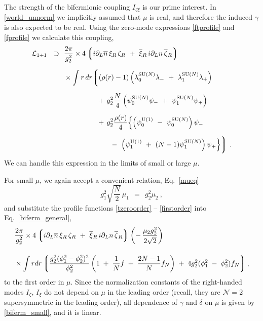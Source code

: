 \documentclass[12pt]{article}
\newcommand{\ntwo}{${\mathcal N}=2$ }
\newcommand{\p}{\partial}
\newcommand{\ov}{\overline}
\newcommand{\mc}[1]{\mathcal{#1}}
\newcommand{\lgr}{\left\lgroup}
\newcommand{\rgr}{\right\rgroup}
\newcommand{\loN}{\lambda_0^\text{SU($N$)}}
\newcommand{\llN}{\lambda_1^\text{SU($N$)}}
\newcommand{\poU}{\psi_0^{\rm U(1)}}
\newcommand{\plU}{\psi_1^{\rm U(1)}}
\newcommand{\poN}{\psi_0^\text{SU($N$)}}
\newcommand{\plN}{\psi_1^\text{SU($N$)}}
\begin{document}
	The strength of the bifermionic coupling $ I_{\zeta\xi} $ is  our prime  interest.
	In \eqref{world_unnorm} we  implicitly assumed that $ \mu $ is real, and therefore
	the induced $ \gamma $ is also expected to be real.
	Using the zero-mode expressions \eqref{ftprofile} and \eqref{fprofile} we calculate this coupling,
\begin{align}
%
\notag
	\mc{L}_{\rm 1+1} ~~\supset~~
	&
	\frac{2\pi}{g_2^2} \times  
	4 \lgr  i\p_L \ov{n}\, \xi_R \, \zeta_R  ~+~  \ov{\xi}{}_R \, i \p_L n\, \ov{\zeta}{}_R \rgr
	\\[2mm]
%
\notag
	&
	\times
	\int r\, dr 
	\biggl\lgroup  ( \rho(r)-1 ) \left( \loN \lambda_-   ~+~   \llN \lambda_+ \right)  \\[2mm]
%
\label{biferm_general}
	&
	\qquad\qquad~~
	+\,g_2^2 \frac{N}{4} \left( \poN \psi_-   ~+~   \plN \psi_+ \right)   
	\\[2mm]
%
\notag
	&
	\qquad\qquad~~
	+\, g_2^2 \frac{\rho(r)}{4} \Bigl\{ \left(\poU ~-~ \poN\right) \psi_-   \\[2mm]
\notag
	&
	\qquad\qquad\qquad\;\;
	     		         	-~ \left(\plU ~+~ (N-1)\plN\right) \psi_+ \Bigr\} 
	\biggr\rgroup~.
\end{align}
	We can handle this expression in the limits of small or large $ \mu $.

	For small $ \mu $, we again accept a convenient relation, Eq.~\eqref{mueq}
\[
	g_1^2 \sqrt{\frac{N}{2}}\, \mu_1 ~~=~~ g_2^2 \mu_2~,
\]
	and substitute the profile functions \eqref{tzeroorder} -- \eqref{firstorder} into Eq.~\eqref{biferm_general},
\begin{align}
%
\label{biferm_small}
	&
	\frac{2\pi}{g_2^2} \times  
	4 \lgr  i\p_L \ov{n}\, \xi_R \, \zeta_R  ~+~  \ov{\xi}{}_R \, i \p_L n\, \ov{\zeta}{}_R \rgr
	\left( -\, \frac{\mu_2 g_2^2}{2\sqrt{2}} \right)
	\\[4mm]
%
\notag
	&
	\times
	\int r dr 
	\lgr  \frac{g_2^2(\phi_1^2 - \phi_2^2)^2}{\phi_2^2} 
			\left( 1 \;+\; \frac{1}{N} f \;+\; \frac{2N - 1}{N}f_N \right) 
			\;+\;
		4 g_2^2 (\phi_1^2 \;-\; \phi_2^2) f_N \rgr,
\end{align}
	to the first order in $ \mu $.
	Since the normalization constants of the right-handed modes $ I_\zeta $, $ I_\xi $ do not
	depend on $ \mu $ in the leading order (recall, they are \ntwo supersymmetric in the leading order),
	all dependence of $ \gamma $ and $ \delta $ on $ \mu $ is given by \eqref{biferm_small},
	and it is linear.
\end{document}
